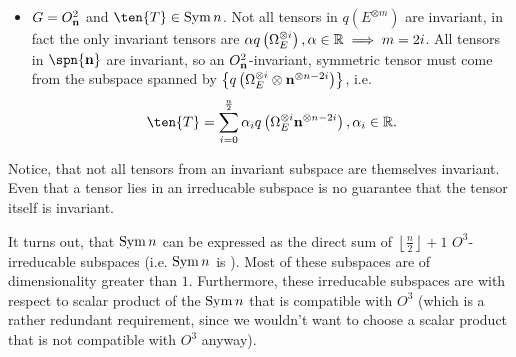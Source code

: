 {\begin{remark}
\begin{itemize}
		\item $G=O^2_{\mathbf{n}}$ and $\ten{T}\in\Sym{n}$. Not all tensors in $q\left(E^{\otimes m}\right)$ are invariant, in fact the only invariant tensors are $\alpha q\left(\Omega_E^{\otimes i}\right), \alpha\in\mathbb{R}\implies m=2i$. All tensors in $\spn{\vc{n}}$ are invariant, so an $O^2_{\mathbf{n}}$-invariant, symmetric tensor must come from the subspace spanned by $\left\{q\left(\Omega_E^{\otimes i}\otimes \mathbf{n}^{\otimes n-2i}\right)\right\}$, i.e.
		\begin{equation}
			\ten{T}=\sum_{i=0}^{\frac{n}{2}} \alpha_i q\left(\Omega_E^{\otimes i}\vc{n}^{\otimes n-2i}\right), \alpha_i \in \IR.
			\label{eq:O2invariantTensors}
		\end{equation}
	\end{itemize}
	Notice, that not all tensors from an invariant subspace are themselves invariant. Even that a tensor lies in an irreducable subspace is no guarantee that the tensor itself is invariant. 
\end{remark}

\begin{example}
	It turns out, that $\operatorname{Sym}{n}$ can be expressed as the direct sum of $\left\lfloor\frac{n}{2}\right\rfloor+1$ $O^3$-irreducable subspaces (i.e. $\operatorname{Sym}{n}$ is ). Most of these subspaces are of dimensionality greater than $1$. Furthermore, these irreducable subspaces are  with respect to  scalar product of the $\operatorname{Sym}{n}$ that is compatible with $O^3$ (which is a rather redundant requirement, since we wouldn't want to choose a scalar product that is not compatible with $O^3$ anyway).
	

\end{example}}
